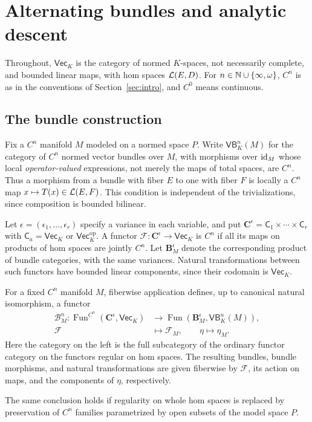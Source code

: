 \section{Alternating bundles and analytic descent}\label{sec:bundles}

Throughout, $\mathsf{Vec}_K$ is the category of normed $K$-spaces, not necessarily complete, and bounded linear maps, with hom spaces $\mathcal L(E,D)$. For $n\in\mathbb N\cup\{\infty,\omega\}$, $C^n$ is as in the conventions of Section~\ref{sec:intro}, and $C^0$ means continuous.

\subsection{The bundle construction}

Fix a $C^n$ manifold $M$ modeled on a normed space $P$. Write $\mathsf{VB}^n_K(M)$ for the category of $C^n$ normed vector bundles over $M$, with morphisms over $\mathrm{id}_M$ whose local \emph{operator-valued} expressions, not merely the maps of total spaces, are $C^n$. Thus a morphism from a bundle with fiber $E$ to one with fiber $F$ is locally a $C^n$ map $x\mapsto T(x)\in\mathcal L(E,F)$. This condition is independent of the trivializations, since composition is bounded bilinear.

Let $\epsilon=(\epsilon_1,\ldots,\epsilon_r)$ specify a variance in each variable, and put $\mathbf C^\epsilon=\mathsf C_1\times\cdots\times\mathsf C_r$ with $\mathsf C_a=\mathsf{Vec}_K$ or $\mathsf{Vec}_K^{\mathrm{op}}$. A functor $\mathcal F\colon\mathbf C^\epsilon\to\mathsf{Vec}_K$ is $C^n$ if all its maps on products of hom spaces are jointly $C^n$. Let $\mathbf B^\epsilon_M$ denote the corresponding product of bundle categories, with the same variances. Natural transformations between such functors have bounded linear components, since their codomain is $\mathsf{Vec}_K$.

\begin{theorem}\label{thm:bundle-lifting}
For a fixed $C^n$ manifold $M$, fiberwise application defines, up to canonical natural isomorphism, a functor
\[
\begin{aligned}
 \mathcal B_M^n\colon
 \operatorname{Fun}^{C^n}(\mathbf C^\epsilon,\mathsf{Vec}_K)
 &\longrightarrow
 \operatorname{Fun}(\mathbf B^\epsilon_M,\mathsf{VB}^n_K(M)),\\
 \mathcal F&\longmapsto\mathcal F_M,\qquad
 \eta\longmapsto\eta_M.
\end{aligned}
\]
Here the category on the left is the full subcategory of the ordinary functor category on the functors regular on hom spaces. The resulting bundles, bundle morphisms, and natural transformations are given fiberwise by $\mathcal F$, its action on maps, and the components of $\eta$, respectively.

The same conclusion holds if regularity on whole hom spaces is replaced by preservation of $C^n$ families parametrized by open subsets of the model space $P$.
\end{theorem}

